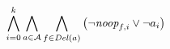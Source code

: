 \[ \bigwedge\limits_{\substack{i=0}}^{k} \bigwedge\limits_{\substack{a\in \mathcal{A}}} \bigwedge\limits_{\substack{f \in \mathit{Del}(a)}}\left(\neg \textit{noop}_{f,i} \vee \neg a_{i}\right) \]


%
%
%
%
%
